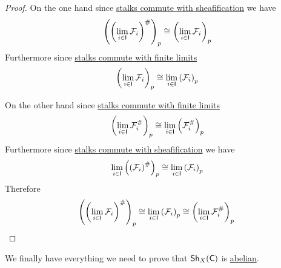 \documentclass[../../main]{subfiles}
\begin{document}
\begin{proof}
  On the one hand since \hyperref[lemma:stalk-commute-sheafification]{stalks commute with sheafification} we have
  \begin{equation*}
    \left( \left( \lim_{i \in \mathsf{I}} \mathcal{F}_{i} \right)^{\#} \right)_{p} \cong \left( \lim_{i \in \mathsf{I}} \mathcal{F}_{i} \right)_{p}
  \end{equation*}
  Furthermore since \hyperref[rem:stalk-commute-finite-limits]{stalks commute with finite limits}
  \begin{equation*}
    \left( \lim_{i \in \mathsf{I}} \mathcal{F}_{i} \right)_{p} \cong \lim_{i \in \mathsf{I}} \left(\mathcal{F}_{i}\right)_{p}
  \end{equation*}

  On the other hand since \hyperref[rem:stalk-commute-finite-limits]{stalks commute with finite limits}
  \begin{equation*}
    \left(\lim_{i \in \mathsf{I}} \mathcal{F}_{i}^{\#} \right)_{p} \cong \lim_{i \in \mathsf{I}} \left(\mathcal{F}_{i}^{\#}\right)_{p}
  \end{equation*}
  Furthermore since \hyperref[lemma:stalk-commute-sheafification]{stalks commute with sheafification} we have
  \begin{equation*}
    \lim_{i \in \mathsf{I}} \left(\left( \mathcal{F}_{i} \right)^{\#}\right)_{p} \cong \lim_{i \in \mathsf{I}} \left(\mathcal{F}_{i}\right)_{p}
  \end{equation*}
  Therefore
  \begin{equation*}
    \left( \left( \lim_{i \in \mathsf{I}} \mathcal{F}_{i} \right)^{\#} \right)_{p} \cong \lim_{i \in \mathsf{I}} \left(\mathcal{F}_{i}\right)_{p} \cong \left(\lim_{i \in \mathsf{I}} \mathcal{F}_{i}^{\#} \right)_{p} \qedhere
  \end{equation*}
\end{proof}

We finally have everything we need to prove that \(\mathsf{Sh}_{X}(\mathsf{C})\) is \hyperref[def:abelian-category]{abelian}.
\end{document}
